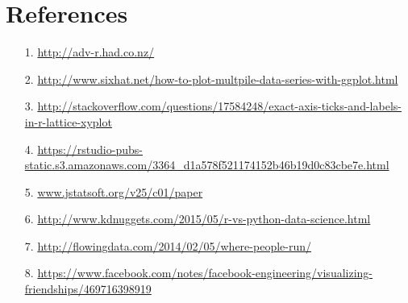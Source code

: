 
\section{References}

\begin{frame}
  \begin{itemize}
    \item[1.] \url{http://adv-r.had.co.nz/}
    \item[2.] \url{http://www.sixhat.net/how-to-plot-multpile-data-series-with-ggplot.html}
    \item[3.] \url{http://stackoverflow.com/questions/17584248/exact-axis-ticks-and-labels-in-r-lattice-xyplot}
    \item[4.] \url{https://rstudio-pubs-static.s3.amazonaws.com/3364_d1a578f521174152b46b19d0c83cbe7e.html}
    \item[5.] \url{www.jstatsoft.org/v25/c01/paper}
    \item[6.] \url{http://www.kdnuggets.com/2015/05/r-vs-python-data-science.html}
    \item[7.] \url{http://flowingdata.com/2014/02/05/where-people-run/}
    \item[8.] \url{https://www.facebook.com/notes/facebook-engineering/visualizing-friendships/469716398919}
  \end{itemize}
\end{frame}



